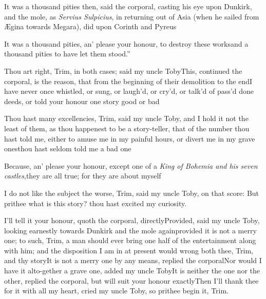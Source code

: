 \documentclass{article}
\begin{document}
It was a thousand pities then, said the corporal, casting his
eye upon Dunkirk, and the mole, as \textit{Servius Sulpicius},
in returning out of Asia (when he sailed from
Ægina towards Megara), did upon Co\-rinth
and Pyreus\tsh

\tsk \lqq It was a thousand pities, an’ please
your honour, to destroy these works\tsk\break and a thousand
pities to have let them stood.”\tsh

\tsh Thou art right, Trim, in both cases; said
my uncle Toby\tsh This, continued the corporal, is
the reason, that from the beginning of their demolition to the
end\tsh I have never once whistled, or sung, or
laugh’d, or cry’d, or talk’d of pass'd done deeds,
or told your honour one story good or bad\tsh

\tsh Thou hast many excellencies, Trim, said my
uncle Toby, and I hold it not the least of them, as thou
happenest to be a story-teller, that of the number thou hast told me, either to amuse me in my
painful hours, or divert me in my grave ones\tsk thou hast seldom
told me a bad one\tsh

\tsh Because, an’ please your honour, except one
of a \textit{King of Bohemia and his seven castles},\tsk they are
all true; for they are about myself\tsh

I do not like the subject the worse, Trim, said my uncle
Toby, on that score: But prithee what is this story? thou
hast excited my curiosity.

I’ll tell it your honour, quoth the corporal,
directly\tsh Provided, said my uncle Toby, looking
earnestly towards Dun\-kirk and the mole
again\tsh provided it is not a merry one; to such,
Trim, a man should ever bring one half of the entertainment
along with him; and the disposition I am in at present would wrong
both thee, Trim, and thy story\tsk It is\break
not a merry one by any means, replied the corporal\tsk Nor would
I have it alto-\break gether a grave one, added my uncle Toby\tsh It
is neither the one nor the other, replied the corporal, but will
suit your honour exactly\tsh Then I’ll thank thee for it with
all my heart, cried my uncle Toby, so prithee begin it, Trim.
\end{document}

